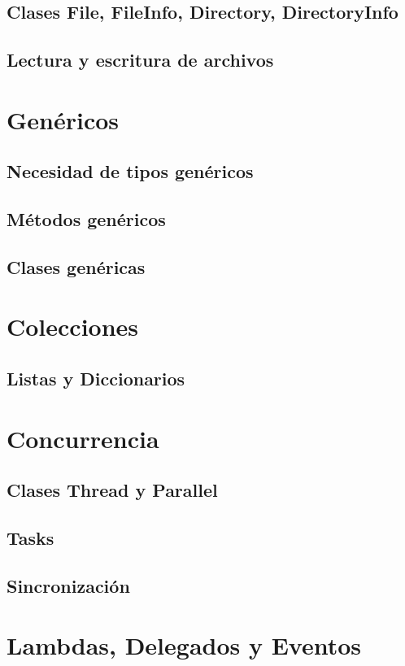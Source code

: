 \documentclass[12pt,a4paper]{report}
\begin{document}
{\section{Clases File, FileInfo, Directory, DirectoryInfo}
\section{Lectura y escritura de archivos}

\chapter{Genéricos}
\section{Necesidad de tipos genéricos}
\section{Métodos genéricos}
\section{Clases genéricas}

\chapter{Colecciones}
\section{Listas y Diccionarios}

\chapter{Concurrencia}
\section{Clases Thread y Parallel}
\section{Tasks}
\section{Sincronización}

\chapter{Lambdas, Delegados y Eventos}
}
\end{document}
